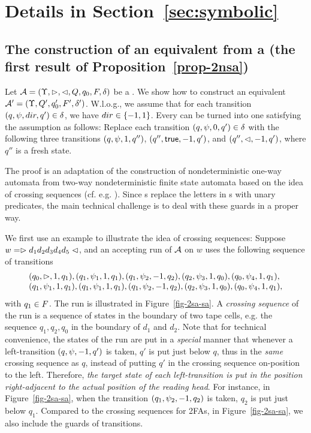 \section{Details in Section~\ref{sec:symbolic}}\label{app-sym}

\subsection{The construction of an equivalent \SA{} from a \SSA{}(the first result of Proposition~\ref{prop-2nsa})}

Let $\mathcal{A} = (\Upsilon, \vartriangleright, \vartriangleleft, Q, q_0, F, \delta)$ be a \SSA. We show how to construct an equivalent \SA{} $\mathcal{A}' =  (\Upsilon, Q', q'_0, F', \delta')$.
W.l.o.g., we assume that for each transition $(q, \psi, dir, q') \in \delta$, we have $dir \in \{-1,1\}$. Every \SSA{} can be turned into one satisfying the assumption as follows: Replace each transition $(q, \psi, 0, q') \in \delta$ with the following three transitions $(q, \psi, 1, q'')$, $(q'', \mathsf{true}, -1, q')$, and $(q'', \vartriangleleft, -1, q')$, where $q''$ is a fresh state.

The proof is an adaptation of the  construction of nondeterministic one-way automata from two-way nondeterministic finite state automata based on the idea of crossing sequences (cf. e.g. \cite{HU79}). Since \SSA{}s replace the letters in \FFA{}s with unary predicates, the main technical challenge is to deal with these guards in a proper way.

We first use an example to illustrate the idea of crossing sequences: Suppose $w = \vartriangleright d_1 d_2 d_3 d_4 d_5\vartriangleleft$, and an accepting run of $\mathcal{A}$ on $w$ uses the following sequence of transitions 
\[
\begin{array}{l}
(q_0, \vartriangleright, 1, q_1), (q_1, \psi_1, 1, q_1), (q_1, \psi_2, -1, q_2), (q_2, \psi_3, 1, q_0), (q_0, \psi_4, 1, q_1), \\
(q_1, \psi_1, 1, q_1), (q_1, \psi_1, 1, q_1), (q_1, \psi_2, -1, q_2), (q_2, \psi_3, 1, q_0), (q_0, \psi_4, 1, q_1),
\end{array}
\] 
with $q_1 \in F$.
The run is illustrated in Figure~\ref{fig-2sa-sa}. A \emph{crossing sequence} of the run is a sequence of states in the boundary of two tape cells, e.g. the sequence $q_1, q_2, q_0$ in the boundary of $d_1$ and $d_2$. Note that for technical convenience, the states of the run are put in a \emph{special} manner that whenever a left-transition $(q, \psi, -1, q')$ is taken, $q'$ is put just below $q$, thus in the \emph{same} crossing sequence as $q$, instead of putting $q'$ in the crossing sequence on-position to the left. Therefore, 
\emph{the target state of each left-transition is put in the position right-adjacent to the actual position of the reading head}.
For instance, in Figure~\ref{fig-2sa-sa}, when the transition $(q_1, \psi_2, -1, q_2)$ is taken, $q_2$ is put just below $q_1$. Compared to the crossing sequences for 2FAs, in Figure~\ref{fig-2sa-sa}, we also include the guards of transitions. 

